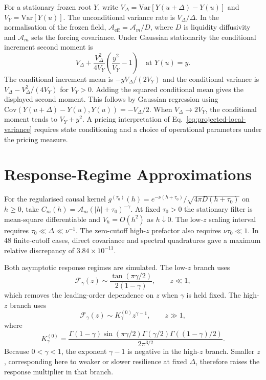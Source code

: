 \documentclass[11pt]{article}
\newcommand{\Aeff}{\mathcal A_{\mathrm{eff}}}
\newcommand{\Fresp}{\mathcal F}
\begin{document}
For a stationary frozen root \(Y\), write
\(V_\Delta=\mathrm{Var}[Y(u+\Delta)-Y(u)]\) and \(V_Y=\mathrm{Var}[Y(u)]\).
The unconditional variance rate is \(V_\Delta/\Delta\). In the normalisation
of the frozen field, \(\Aeff=\mathcal A_m/D\), where \(D\) is liquidity
diffusivity and \(\mathcal A_m\) sets the forcing covariance. Under Gaussian
stationarity the conditional increment second moment is
\[
 V_\Delta+\frac{V_\Delta^2}{4V_Y}\left(\frac{y^2}{V_Y}-1\right)
 \quad\text{at }Y(u)=y .
\]
The conditional increment mean is \(-y V_\Delta/(2V_Y)\) and the
conditional variance is \(V_\Delta-V_\Delta^2/(4V_Y)\) for \(V_Y>0\).
Adding the squared conditional mean gives the displayed second moment.
This follows by Gaussian regression using
\(\mathrm{Cov}(Y(u+\Delta)-Y(u),Y(u))=-V_\Delta/2\).
When \(V_\Delta\to2V_Y\), the conditional moment tends to \(V_Y+y^2\).
A pricing interpretation of Eq.~\eqref{eq:projected-local-variance}
requires state conditioning and a choice of operational parameters under
the pricing measure.

\section{Response-Regime Approximations}

For the regularised causal kernel
\(g^{(\tau_0)}(h)=e^{-\nu(h+\tau_0)}/\sqrt{4\pi D(h+\tau_0)}\)
on \(h\ge0\), take \(C_m(h)=\mathcal A_m(|h|+\tau_0)^{-\gamma}\).
At fixed \(\tau_0>0\) the stationary filter is mean-square differentiable
and \(V_h=O(h^2)\) as \(h\downarrow0\). The low-\(z\) scaling interval
requires \(\tau_0\ll\Delta\ll\nu^{-1}\). The zero-cutoff high-\(z\)
prefactor also requires \(\nu\tau_0\ll1\). In 48 finite-cutoff cases,
direct covariance and spectral quadratures gave a maximum relative
discrepancy of \(3.84\times10^{-11}\).

Both asymptotic response regimes are simulated. The low-\(z\) branch uses
\begin{equation}
 \Fresp_\gamma(z)
 \sim
 \frac{\tan(\pi\gamma/2)}{2(1-\gamma)},
 \qquad z\ll1,
 \label{eq:low-z-response}
\end{equation}
which removes the leading-order dependence on \(z\) when \(\gamma\) is held
fixed. The high-\(z\) branch uses
\begin{equation}
 \Fresp_\gamma(z)
 \sim
 K_\gamma^{(0)}z^{\gamma-1},
 \qquad z\gg1,
 \label{eq:high-z-response}
\end{equation}
where
\begin{equation}
 K_\gamma^{(0)}
 =
 \frac{
 \Gamma(1-\gamma)\sin(\pi\gamma/2)
 \Gamma(\gamma/2)\Gamma((1-\gamma)/2)
 }{2\pi^{3/2}}.
 \label{eq:k-gamma}
\end{equation}
Because \(0<\gamma<1\), the exponent \(\gamma-1\) is negative in the
high-\(z\) branch. Smaller \(z\), corresponding here to weaker or slower
resilience at fixed \(\Delta\), therefore raises the response multiplier in
that branch.
\end{document}

